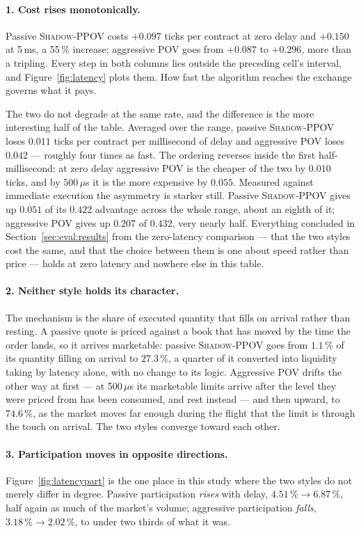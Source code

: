 \documentclass[11pt]{article}
\newcommand{\pov}{\textsc{Shadow-PPOV}}
\begin{document}
\paragraph{1. Cost rises monotonically.} Passive \pov{} costs
$+0.097$ ticks per contract at zero delay and $+0.150$ at 5\,ms, a 55\,\%
increase; aggressive POV goes from $+0.087$ to $+0.296$, more than a tripling.
Every step in both columns lies outside the preceding cell's interval, and
Figure~\ref{fig:latency} plots them. How fast the algorithm reaches the exchange
governs what it pays.

The two do not degrade at the same rate, and the difference is the more
interesting half of the table. Averaged over the range, passive \pov{} loses
$0.011$ ticks per contract per millisecond of delay and aggressive POV loses
$0.042$ --- roughly four times as fast. The ordering reverses inside the first
half-millisecond: at zero delay aggressive POV is the cheaper of the two by
$0.010$ ticks, and by $500\,\mu$s it is the more expensive by $0.055$. Measured
against immediate execution the asymmetry is starker still. Passive \pov{}
gives up $0.051$ of its $0.422$ advantage across the whole range, about an
eighth of it; aggressive POV gives up $0.207$ of $0.432$, very nearly half.
Everything concluded in Section~\ref{sec:eval:results} from the zero-latency
comparison --- that the two styles cost the same, and that the choice between
them is one about speed rather than price --- holds at zero latency and nowhere
else in this table.

\paragraph{2. Neither style holds its character.} The mechanism is the share of
executed quantity that fills on arrival rather than resting. A passive quote is
priced against a book that has moved by the time the order lands, so it arrives
marketable: passive \pov{} goes from $1.1\,\%$ of its quantity filling on
arrival to $27.3\,\%$, a quarter of it converted into liquidity taking by
latency alone, with no change to its logic. Aggressive POV
drifts the other way at first --- at 500\,$\mu$s its marketable limits arrive
after the level they were priced from has been consumed, and rest instead ---
and then upward, to $74.6\,\%$, as the market moves far enough during the flight
that the limit is through the touch on arrival. The two styles converge toward
each other.

\paragraph{3. Participation moves in opposite directions.}
Figure~\ref{fig:latencypart} is the one place in this study where the two styles
do not merely differ in degree. Passive participation \emph{rises} with delay,
$4.51\,\% \to 6.87\,\%$, half again as much of the market's volume; aggressive
participation \emph{falls}, $3.18\,\% \to 2.02\,\%$, to under two thirds of what
it was.
\end{document}
